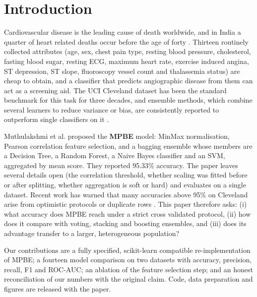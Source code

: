 \documentclass[conference,a4paper,10pt]{IEEEtran}
\begin{document}
\section{Introduction}
Cardiovascular disease is the leading cause of death worldwide, and in India a quarter of heart related deaths occur before the age of forty \cite{r1}. Thirteen routinely collected attributes (age, sex, chest pain type, resting blood pressure, cholesterol, fasting blood sugar, resting ECG, maximum heart rate, exercise induced angina, ST depression, ST slope, fluoroscopy vessel count and thalassemia status) are cheap to obtain, and a classifier that predicts angiographic disease from them can act as a screening aid. The UCI Cleveland dataset \cite{r22} has been the standard benchmark for this task for three decades, and ensemble methods, which combine several learners to reduce variance or bias, are consistently reported to outperform single classifiers on it \cite{r8,r9,r14}.

Muthulakshmi et al. \cite{r1} proposed the \textbf{MPBE} model: MinMax normalisation, Pearson correlation feature selection, and a bagging ensemble whose members are a Decision Tree, a Random Forest, a Naive Bayes classifier and an SVM, aggregated by mean score. They reported 95.33\% accuracy. The paper leaves several details open (the correlation threshold, whether scaling was fitted before or after splitting, whether aggregation is soft or hard) and evaluates on a single dataset. Recent work has warned that many accuracies above 95\% on Cleveland arise from optimistic protocols or duplicate rows \cite{r11,r21}. This paper therefore asks: (i) what accuracy does MPBE reach under a strict cross validated protocol, (ii) how does it compare with voting, stacking and boosting ensembles, and (iii) does its advantage transfer to a larger, heterogeneous population?

Our contributions are a fully specified, scikit-learn compatible re-implementation of MPBE; a fourteen model comparison on two datasets with accuracy, precision, recall, F1 and ROC-AUC; an ablation of the feature selection step; and an honest reconciliation of our numbers with the original claim. Code, data preparation and figures are released with the paper.
\end{document}
